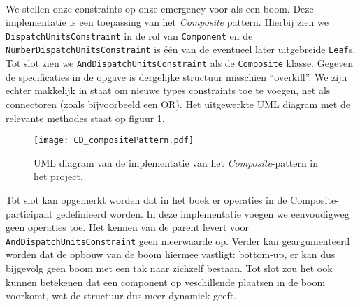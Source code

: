 \paragraph{}
We stellen onze constraints op onze emergency voor als een boom. Deze implementatie is een toepassing van het \textit{Composite} pattern. Hierbij zien we \texttt{Dispatch\-Units\-Constraint} in de rol van \texttt{Component} en de \texttt{Number\-Dispatch\-Units\-Constraint} is \'e\'en van de eventueel later uitgebreide \texttt{Leaf}s. Tot slot zien we \texttt{And\-Dispatch\-Units\-Constraint} als de \texttt{Composite} klasse. Gegeven de specificaties in de opgave is dergelijke structuur misschien ``overkill''. We zijn echter makkelijk in staat om nieuwe types constraints toe te voegen, net als connectoren (zoals bijvoorbeeld een OR). Het uitgewerkte UML diagram met de relevante methodes staat op figuur \ref{fig:compositePattern}.
\begin{figure}[h!]
\texttt{[image: CD\_compositePattern.pdf]}
\caption{UML diagram van de implementatie van het \textit{Composite}-pattern in het project.}
\label{fig:compositePattern}
\end{figure}
Tot slot kan opgemerkt worden dat in het boek er operaties in de Composite-participant gedefinieerd worden. In deze implementatie voegen we eenvoudigweg geen operaties toe. Het kennen van de parent levert voor \verb+AndDispatchUnitsConstraint+ geen meerwaarde op. Verder kan geargumenteerd worden dat de opbouw van de boom hiermee vastligt: bottom-up, er kan dus bijgevolg geen boom met een tak naar zichzelf bestaan. Tot slot zou het ook kunnen betekenen dat een component op veschillende plaatsen in de boom voorkomt, wat de structuur dus meer dynamiek geeft.
